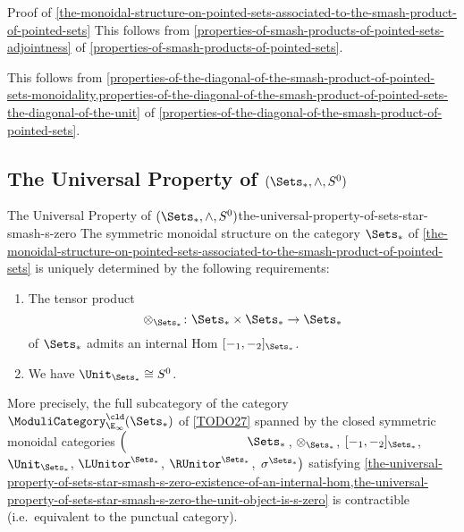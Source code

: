 \begin{Proof}{Proof of \cref{the-monoidal-structure-on-pointed-sets-associated-to-the-smash-product-of-pointed-sets}}
    This follows from \cref{properties-of-smash-products-of-pointed-sets-adjointness} of \cref{properties-of-smash-products-of-pointed-sets}.

    This follows from \cref{properties-of-the-diagonal-of-the-smash-product-of-pointed-sets-monoidality,properties-of-the-diagonal-of-the-smash-product-of-pointed-sets-the-diagonal-of-the-unit} of \cref{properties-of-the-diagonal-of-the-smash-product-of-pointed-sets}.
\end{Proof}
\subsection{The Universal Property of $(\Sets_{*},\wedge,S^{0})$}\label{subsection-the-universal-property-of-the-smash-product-of-pointed-sets}
\begin{theorem}{The Universal Property of $(\Sets_{*},\wedge,S^{0})$}{the-universal-property-of-sets-star-smash-s-zero}%
    The symmetric monoidal structure on the category $\Sets_{*}$ of \cref{the-monoidal-structure-on-pointed-sets-associated-to-the-smash-product-of-pointed-sets} is uniquely determined by the following requirements:
    \begin{enumerate}
        \item\label{the-universal-property-of-sets-star-smash-s-zero-existence-of-an-internal-hom}The tensor product
            \[
                \otimes_{\Sets_{*}}%
                \colon
                \Sets_{*}\times\Sets_{*}
                \to
                \Sets_{*}
            \]%
            of $\Sets_{*}$ admits an internal Hom $[-_{1},-_{2}]_{\Sets_{*}}$.
        \item\label{the-universal-property-of-sets-star-smash-s-zero-the-unit-object-is-s-zero}We have $\Unit_{\Sets_{*}}\cong S^{0}$.
    \end{enumerate}
    More precisely, the full subcategory of the category $\ModuliCategory^{\cld}_{\E_{\infty}}(\Sets_{*})$ of \cref{TODO27} spanned by the closed symmetric monoidal categories $\left(\phantom{\mrp{\LUnitor^{\Sets_{*}}}}\Sets_{*}\right.$, $\otimes_{\Sets_{*}}$, $[-_{1},-_{2}]_{\Sets_{*}}$, $\Unit_{\Sets_{*}}$, $\LUnitor^{\Sets_{*}}$, $\RUnitor^{\Sets_{*}}$, $\left.\sigma^{\Sets_{*}}\right)$ satisfying \cref{the-universal-property-of-sets-star-smash-s-zero-existence-of-an-internal-hom,the-universal-property-of-sets-star-smash-s-zero-the-unit-object-is-s-zero} is contractible (i.e.\ equivalent to the punctual category).
\end{theorem}

